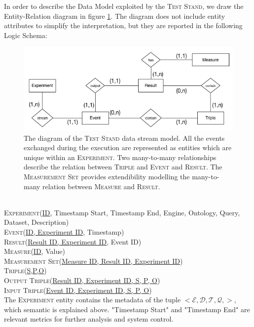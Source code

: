 \noindent In order to describe the Data Model exploited by the \textsc{Test Stand}, we draw the Entity-Relation diagram in figure \ref{fig:er}. The diagram does not include entity attributes to simplify the interpretation, but they are reported in the following Logic Schema:
\begin{figure}[tbh]
  \centering
	\includegraphics[width=\linewidth]{images/er-db}
	\caption[\textsc{Test Stand} Data Stream ER-Diagram]{The diagram of the \textsc{Test Stand} data stream model. All the events exchanged during the execution are represented as entities which are unique within an \textsc{Experiment}. Two many-to-many relationships describe the relation between \textsc{Triple} and \textsc{Event} and \textsc{Result}. The \textsc{Measurement Set} provides extendibility modelling the many-to-many relation between \textsc{Measure} and \textsc{Result}.}
  	\label{fig:er}
\end{figure}\\
\noindent\textsc{Experiment}(\underline{ID}, Timestamp Start, Timestamp End, Engine, Ontology, Query, Dataset, Description)\\
\textsc{Event}(\underline{ID, Experiment ID}, Timestamp)\\
\textsc{Result}(\underline{Result ID, Experiment ID}, Event ID)\\
\textsc{Measure}(\underline{ID}, Value)\\
\textsc{Measurement Set}(\underline{Measure ID, Result ID, Experiment ID})\\
\textsc{Triple}(\underline{S,P,O})\\
\textsc{Output Triple}(\underline{Result ID, Experiment ID, S, P, O})\\
\textsc{Input Triple}(\underline{Event ID, Experiment ID, S, P, O})\\

The \textsc{Experiment} entity contains the metadata of the tuple $<\mathcal{E},\mathcal{D},\mathcal{T},\mathcal{Q},>$, which semantic is explained above. "Timestamp Start" and "Timestamp End" are relevant metrics for further analysis and system control. 

